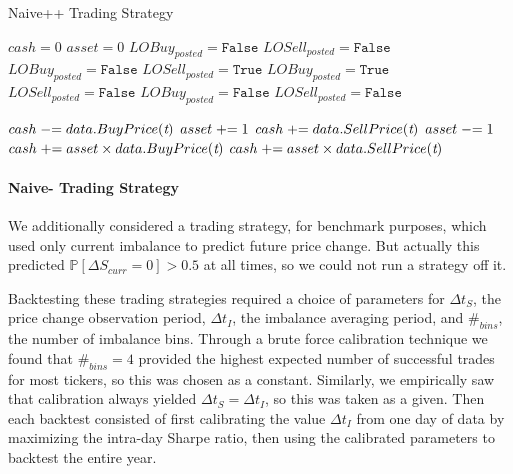 \begin{algorithm}[H]
\caption{Naive++ Trading Strategy}
\begin{algorithmic}[1]
\State $cash = 0$
\State $asset = 0$
\State $LOBuy_{posted} = \texttt{False}$
\State $LOSell_{posted} = \texttt{False}$
		\State $LOBuy_{posted} = \texttt{False}$
		\State $LOSell_{posted} = \texttt{True}$
		\State $LOBuy_{posted} = \texttt{True}$
		\State $LOSell_{posted} = \texttt{False}$
		\State $LOBuy_{posted} = \texttt{False}$
		\State $LOSell_{posted} = \texttt{False}$
	\EndIf

			\State $cash \mathrel{-}= data.BuyPrice(\textit{t})$	
			\State $asset \mathrel{+}= 1$
			\State $cash \mathrel{+}= data.SellPrice(\textit{t})$
			\State $asset \mathrel{-}= 1$
		\EndIf
	\EndFor
\EndFor
{} 
\State $cash \mathrel{+}= asset \times data.BuyPrice(\textit{t})$
\State $cash \mathrel{+}= asset \times data.SellPrice(\textit{t})$	
\EndIf
\end{algorithmic}
\end{algorithm}

\paragraph{Naive- Trading Strategy} We additionally considered a trading strategy, for benchmark purposes, which used only current imbalance to predict future price change. But actually this predicted $\mathbb{P} \left[ \Delta S_{curr} = 0 \right] > 0.5$ at all times, so we could not run a strategy off it.

Backtesting these trading strategies required a choice of parameters for $\Delta t_S$, the price change observation period, $\Delta t_I$, the imbalance averaging period, and $\#_{bins}$, the number of imbalance bins. Through a brute force calibration technique we found that $\#_{bins} = 4$ provided the highest expected number of successful trades for most tickers, so this was chosen as a constant. Similarly, we empirically saw that calibration always yielded $\Delta t_S = \Delta t_I$, so this was taken as a given. Then each backtest consisted of first calibrating the value $\Delta t_I$ from one day of data by maximizing the intra-day Sharpe ratio, then using the calibrated parameters to backtest the entire year.

